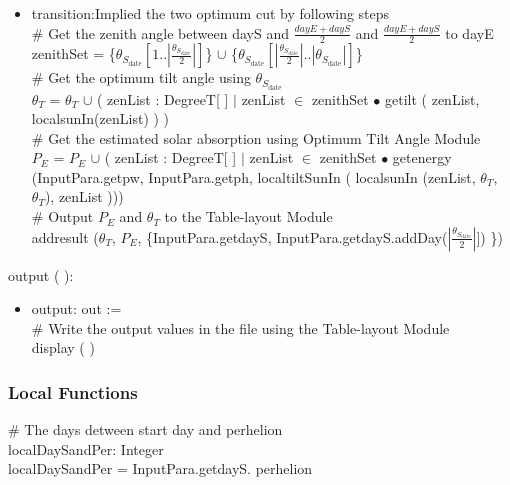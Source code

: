 \documentclass[12pt, titlepage]{article}
\begin{document}
\begin{itemize}
\item transition:Implied the two optimum cut by following steps\\

$\#$ Get the zenith angle between dayS and
$\frac{dayE + dayS}{2}$ and $\frac{dayE + dayS}{2}$ to dayE\\
zenithSet =  \{$\theta_{S_{\text{date}}}[1.. | \frac{\theta_{S_{\text{date}}}}{2}|]$\} $\cup$ \{$\theta_{S_{\text{date}}}[| \frac{\theta_{S_{\text{date}}}}{2}|.. | \theta_{S_{\text{date}}}|]$\}\\
 
$\#$ Get the optimum tilt angle using $\theta_{S_{\text{date}}}$\\
$\theta_{T}$ = $\theta_{T}$ $\cup$ ( zenList : DegreeT[ ] $|$ zenList $\in$ zenithSet $\bullet$ getilt ( zenList, localsunIn(zenList) ) )\\

$\#$ Get the estimated solar absorption using Optimum Tilt Angle Module\\

$P_{E}$ = $P_{E}$ $\cup$  ( zenList : DegreeT[ ] $|$ zenList $\in$ zenithSet $\bullet$ getenergy (InputPara.getpw, InputPara.getph, localtiltSunIn ( localsunIn (zenList, $\theta_{T}$, $\theta_{T}$), zenList )))\\

$\#$ Output $P_{E}$ and $\theta_{T}$ to the Table-layout Module\\
addresult ($\theta_{T}$, $P_{E}$, \{InputPara.getdayS, InputPara.getdayS.addDay($| \frac{\theta_{S_{\text{date}}}}{2}|]$) \})\\

\end{itemize}

\noindent  output ( ):
\begin{itemize}
\item output: out :=\\
$\#$ Write the output values in the file using the Table-layout Module\\
display ( )
\end{itemize}
\subsubsection{Local Functions}

$\#$ The days detween start day and perhelion\\
localDaySandPer: Integer\\
localDaySandPer = InputPara.getdayS. perhelion\\
\end{document}
